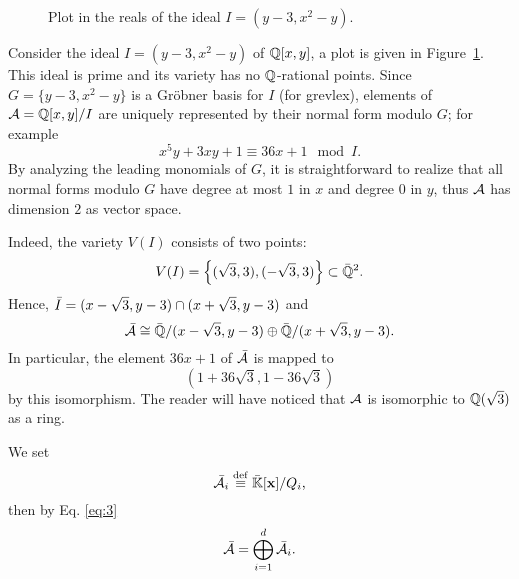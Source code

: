 \begin{example}
  \begin{figure}[ht]
    \centering
    \caption{Plot in the reals of the ideal $I=(y-3,x^2-y)$.}
    \label{fig:ideal-parabola-line}
  \end{figure}

  Consider the ideal $I=(y-3,x^2-y)$ of $\mathbb{Q}[x,y]$, a plot is given in
  Figure~\ref{fig:ideal-parabola-line}. This ideal is prime and its
  variety has no $\mathbb{Q}$-rational points. Since $G=\{y-3,x^2-y\}$ is a
  Gröbner basis for $I$ (for grevlex), elements of
  $\mathcal{A}=\mathbb{Q}[x,y]/I$ are uniquely represented by their normal form
  modulo $G$; for example
  \[x^5y + 3xy + 1 \equiv 36x + 1 \mod I\text{.}\] By analyzing the
  leading monomials of $G$, it is straightforward to realize that all
  normal forms modulo $G$ have degree at most $1$ in $x$ and degree
  $0$ in $y$, thus $\mathcal{A}$ has dimension $2$ as vector space.

  Indeed, the variety $V(I)$ consists of two points:
  \[V(I)=\left\{(\sqrt{3},3), (-\sqrt{3},3)\right\}\subset\bar{\mathbb{Q}}^2\text{.}\]
  Hence, $\bar{I}=(x-\sqrt{3},y-3)\cap(x+\sqrt{3},y-3)$ and
  \[\bar{\mathcal{A}}\cong \bar{\mathbb{Q}}/(x-\sqrt{3},y-3) \oplus
  \bar{\mathbb{Q}}/(x+\sqrt{3},y-3)\text{.}\] In particular, the element
  $36x+1$ of $\bar{\mathcal{A}}$ is mapped to
  \[(1+36\sqrt{3},1-36\sqrt{3})\] by this isomorphism. The reader will
  have noticed that $\mathcal{A}$ is isomorphic to $\mathbb{Q}(\sqrt{3})$ as a ring.
\end{example}

We set 
\begin{equation}
  \label{eq:4}
  \bar{\mathcal{A}}_i\overset{\mathrm{def}}{\equiv} \bar{\mathbb{K}}[\mathbf{x}]/Q_i
  \text{,}
\end{equation}
then by Eq. \eqref{eq:3} 
\begin{equation}
  \label{eq:5}
  \bar{\mathcal{A}} = \bigoplus_{i=1}^d\bar{\mathcal{A}_i}
  \text{.}
\end{equation}


